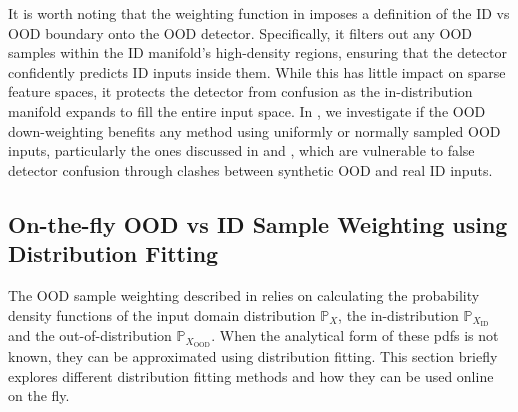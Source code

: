 \noindent It is worth noting that the weighting function in  imposes a definition of the ID vs OOD boundary onto the OOD detector. Specifically, it filters out any OOD samples within the ID manifold's high-density regions, ensuring that the detector confidently predicts ID inputs inside them. While this has little impact on sparse feature spaces, it protects the detector from confusion as the in-distribution manifold expands to fill the entire input space. In , we investigate if the OOD down-weighting benefits any method using uniformly or normally sampled OOD inputs, particularly the ones discussed in  and , which are vulnerable to false detector confusion through clashes between synthetic OOD and real ID inputs.

\subsection{On-the-fly OOD vs ID Sample Weighting using Distribution Fitting} \label{txt:online-distribution-fitting}

The OOD sample weighting described in  relies on calculating the probability density functions of the input domain distribution $\mathbb{P}_X$, the in-distribution $\mathbb{P}_{X_{\text{ID}}}$ and the out-of-distribution $\mathbb{P}_{X_{\text{OOD}}}$. When the analytical form of these pdfs is not known, they can be approximated using distribution fitting. This section briefly explores different distribution fitting methods and how they can be used online on the fly.

